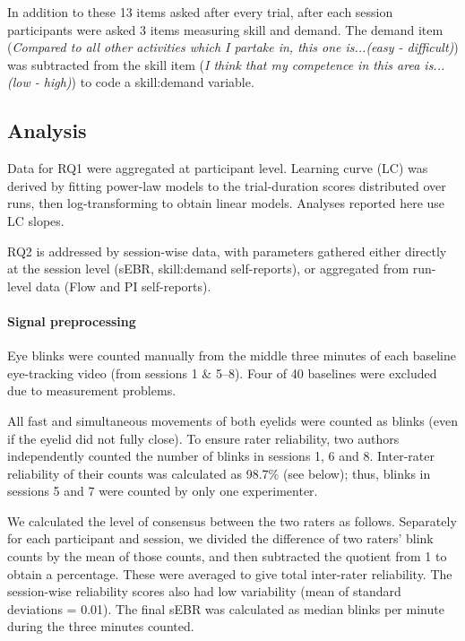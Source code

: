 \documentclass[10pt,letterpaper,floatsintext]{article}
\begin{document}
In addition to these 13 items asked after every trial, after each session participants were asked 3 items measuring skill and demand. The demand item (\textit{Compared to all other activities which I partake in, this one is...(easy - difficult)}) was subtracted from the skill item (\textit{I think that my competence in this area is...(low - high)}) to code a skill:demand variable.


\subsection*{Analysis}
Data for RQ1 were aggregated at participant level. Learning curve (LC) was derived by fitting power-law models to the trial-duration scores distributed over runs, then log-transforming to obtain linear models. Analyses reported here use LC slopes.

RQ2 is addressed by session-wise data, with parameters gathered either directly at the session level (sEBR, skill:demand self-reports), or aggregated from run-level data (Flow and PI self-reports).

\paragraph{Signal preprocessing}
Eye blinks were counted manually from the middle three minutes of each baseline eye-tracking video (from sessions 1 \& 5--8). Four of 40 baselines were excluded due to measurement problems.

All fast and simultaneous movements of both eyelids were counted as blinks (even if the eyelid did not fully close). To ensure rater reliability, two authors independently counted the number of blinks in sessions 1, 6 and 8. Inter-rater reliability of their counts was calculated as 98.7\% (see below); thus, blinks in sessions 5 and 7 were counted by only one experimenter.

We calculated the level of consensus between the two raters as follows. Separately for each participant and session, we divided the difference of two raters' blink counts by the mean of those counts, and then subtracted the quotient from 1 to obtain a percentage. These were averaged to give total inter-rater reliability. The session-wise reliability scores also had low variability (mean of standard deviations = 0.01). The final sEBR was calculated as median blinks per minute during the three minutes counted.
\end{document}
